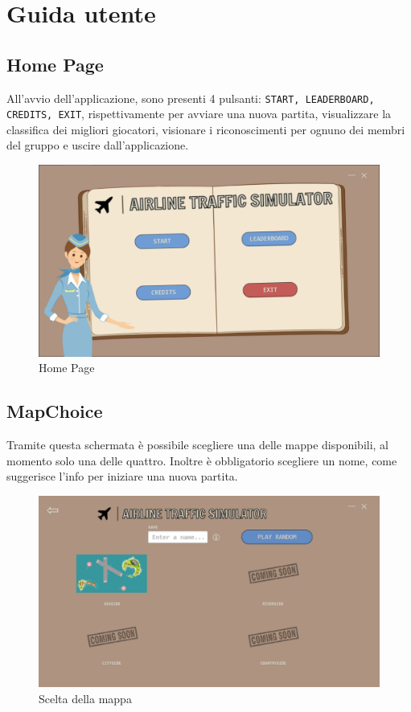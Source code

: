 \documentclass[a4paper,12pt]{report}
\begin{document}
\appendix
\chapter{Guida utente}
\section*{Home Page}
All'avvio dell'applicazione, sono presenti 4 pulsanti: \texttt{START, LEADERBOARD, CREDITS, EXIT}, rispettivamente per avviare una nuova partita, visualizzare la classifica dei migliori giocatori, visionare i riconoscimenti per ognuno dei membri del gruppo e uscire dall'applicazione.
\begin{figure}[H]
    \begin{center}
        \centering
        \includegraphics[width=\textwidth]{img/GuidaUtente/Home.png}
    \end{center}
    \caption{Home Page}
    \label{img:homepage}
\end{figure}

\section*{MapChoice}
Tramite questa schermata è possibile scegliere una delle mappe disponibili, al momento solo una delle quattro. Inoltre è obbligatorio scegliere un nome, come suggerisce l'info per iniziare una nuova partita.
\begin{figure}[H]
    \begin{center}
        \centering
        \includegraphics[width=\textwidth]{img/GuidaUtente/MapChoice.png}
    \end{center}
    \caption{Scelta della mappa}
    \label{img:mapchoice}
\end{figure}
\end{document}
